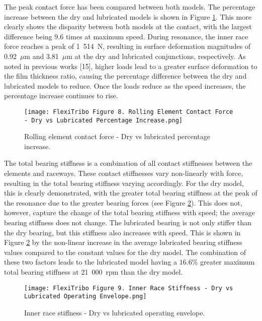 The peak contact force has been compared between both models. The percentage increase between the dry and lubricated models is shown in Figure \ref{Rolling element contact force - Dry vs lubricated percentage increase}. This more clearly shows the disparity between both models at the contact, with the largest difference being 9.6 times at maximum speed. During resonance, the inner race force reaches a peak of 1~514~$\mathrm{N}$, resulting in surface deformation magnitudes of 0.92~$\mu \mathrm{m}$ and 3.81~$\mu \mathrm{m}$ at the dry and lubricated conjunctions, respectively. As noted in previous works [15], higher loads lead to a greater surface deformation to the film thickness ratio, causing the percentage difference between the dry and lubricated models to reduce. Once the loads reduce as the speed increases, the percentage increase continues to rise.

\begin{figure}
	\centering  
	\texttt{[image: FlexiTribo Figure 8. Rolling Element Contact Force - Dry vs Lubricated Percentage Increase.png]}
	\caption{Rolling element contact force - Dry vs lubricated percentage increase.}
	\label{Rolling element contact force - Dry vs lubricated percentage increase}
\end{figure} 

The total bearing stiffness is a combination of all contact stiffnesses between the elements and raceways. These contact stiffnesses vary non-linearly with force, resulting in the total bearing stiffness varying accordingly. For the dry model, this is clearly demonstrated, with the greater total bearing stiffness at the peak of the resonance due to the greater bearing forces (see Figure \ref{Inner race stiffness - Dry vs lubricated operating envelope}). This does not, however, capture the change of the total bearing stiffness with speed; the average bearing stiffness does not change. The lubricated bearing is not only stiffer than the dry bearing, but this stiffness also increases with speed. This is shown in Figure \ref{Inner race stiffness - Dry vs lubricated operating envelope} by the non-linear increase in the average lubricated bearing stiffness values compared to the constant values for the dry model. The combination of these two factors leads to the lubricated model having a $16.6 \%$ greater maximum total bearing stiffness at 21~000~$\mathrm{rpm}$ than the dry model.

\begin{figure}
	\centering  
	\texttt{[image: FlexiTribo Figure 9. Inner Race Stiffness - Dry vs Lubricated Operating Envelope.png]}
	\caption{Inner race stiffness - Dry vs lubricated operating envelope.}
	\label{Inner race stiffness - Dry vs lubricated operating envelope}
\end{figure} 

